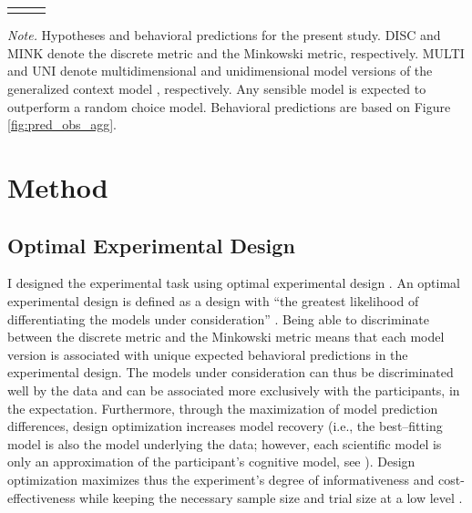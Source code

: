 \documentclass[a4paper,man,natbib]{apa6}
\begin{document}
\begin{table}
\begin{center}
\begin{threeparttable}
\begin{tabular*}{\textwidth}{lp{110mm}p{110mm}}
\bottomrule
\addlinespace
\end{tabular*}
\begin{tablenotes}[para]
\textit{Note.} Hypotheses and behavioral predictions for the present study. DISC and MINK denote the discrete metric and the Minkowski metric, respectively. MULTI and UNI denote multidimensional and unidimensional model versions of the generalized context model \citep{nosofsky1989further}, respectively. Any sensible model is expected to outperform a random choice model. Behavioral predictions are based on Figure \ref{fig:pred_obs_agg}.
\end{tablenotes}
\end{threeparttable}
\end{center}
\end{table}
\vspace{\baselineskip}

\section{Method}

\subsection{Optimal Experimental Design}
I designed the experimental task using optimal experimental design \citep{myung2009optimal}. An optimal experimental design is defined as a design with ``the greatest likelihood of differentiating the models under consideration'' \cite[][p. 500]{myung2009optimal}. Being able to discriminate between the discrete metric and the Minkowski metric means that each model version is associated with unique expected behavioral predictions in the experimental design. The models under consideration can thus be discriminated well by the data and can be associated more exclusively with the participants, in the expectation. Furthermore, through the maximization of model prediction differences, design optimization increases model recovery (i.e., the best--fitting model is also the model underlying the data; however, each scientific model is only an approximation of the participant's cognitive model, see \citealp{myung2009optimal}). 
Design optimization maximizes thus the experiment's degree of informativeness and cost-effectiveness while keeping the necessary sample size and trial size at a low level \citep{cavagnaro2009better, ouyang2016practical, raffert2012optimally, atkinson2007optimum, nelson2005finding}. 
\end{document}
